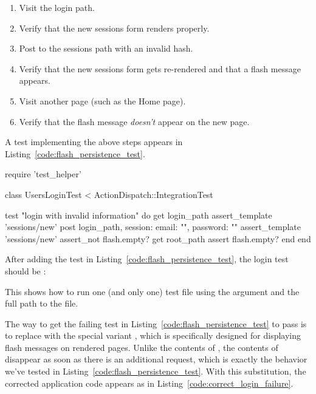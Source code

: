 \begin{enumerate}
\item Visit the login path.
\item Verify that the new sessions form renders properly.
\item Post to the sessions path with an invalid  hash.
\item Verify that the new sessions form gets re-rendered and that a flash message appears.
\item Visit another page (such as the Home page).
\item Verify that the flash message \emph{doesn't} appear on the new page.
\end{enumerate}

\noindent A test implementing the above steps appears in Listing~\ref{code:flash_persistence_test}.

\newpage

\begin{codelisting}
\label{code:flash_persistence_test}
\begin{code}
require 'test_helper'

class UsersLoginTest < ActionDispatch::IntegrationTest

  test "login with invalid information" do
    get login_path
    assert_template 'sessions/new'
    post login_path, session: { email: "", password: "" }
    assert_template 'sessions/new'
    assert_not flash.empty?
    get root_path
    assert flash.empty?
  end
end
\end{code}
\end{codelisting}

After adding the test in Listing~\ref{code:flash_persistence_test}, the login test should be \failing:

\begin{codelisting}
\codecaption{\failing}
\end{codelisting}

\noindent This shows how to run one (and only one) test file using the argument  and the full path to the file.

The way to get the failing test in Listing~\ref{code:flash_persistence_test} to pass is to replace  with the special variant , which is specifically designed for displaying flash messages on rendered pages. Unlike the contents of , the contents of  disappear as soon as there is an additional request, which is exactly the behavior we've tested in Listing~\ref{code:flash_persistence_test}. With this substitution, the corrected application code appears as in Listing~\ref{code:correct_login_failure}.

